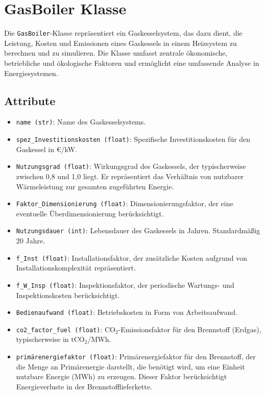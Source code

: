 \section{GasBoiler Klasse}
Die \texttt{GasBoiler}-Klasse repräsentiert ein Gaskesselsystem, das dazu dient, die Leistung, Kosten und Emissionen eines Gaskessels in einem Heizsystem zu berechnen und zu simulieren. Die Klasse umfasst zentrale ökonomische, betriebliche und ökologische Faktoren und ermöglicht eine umfassende Analyse in Energiesystemen.

\subsection{Attribute}
\begin{itemize}
    \item \texttt{name (str)}: Name des Gaskesselsystems.
    \item \texttt{spez\_Investitionskosten (float)}: Spezifische Investitionskosten für den Gaskessel in €/kW.
    \item \texttt{Nutzungsgrad (float)}: Wirkungsgrad des Gaskessels, der typischerweise zwischen 0,8 und 1,0 liegt. Er repräsentiert das Verhältnis von nutzbarer Wärmeleistung zur gesamten zugeführten Energie.
    \item \texttt{Faktor\_Dimensionierung (float)}: Dimensionierungsfaktor, der eine eventuelle Überdimensionierung berücksichtigt.
    \item \texttt{Nutzungsdauer (int)}: Lebensdauer des Gaskessels in Jahren. Standardmäßig 20 Jahre.
    \item \texttt{f\_Inst (float)}: Installationsfaktor, der zusätzliche Kosten aufgrund von Installationskomplexität repräsentiert.
    \item \texttt{f\_W\_Insp (float)}: Inspektionsfaktor, der periodische Wartungs- und Inspektionskosten berücksichtigt.
    \item \texttt{Bedienaufwand (float)}: Betriebskosten in Form von Arbeitsaufwand.
    \item \texttt{co2\_factor\_fuel (float)}: CO$_2$-Emissionsfaktor für den Brennstoff (Erdgas), typischerweise in tCO$_2$/MWh.
    \item \texttt{primärenergiefaktor (float)}: Primärenergiefaktor für den Brennstoff, der die Menge an Primärenergie darstellt, die benötigt wird, um eine Einheit nutzbare Energie (MWh) zu erzeugen. Dieser Faktor berücksichtigt Energieverluste in der Brennstofflieferkette.
\end{itemize}

